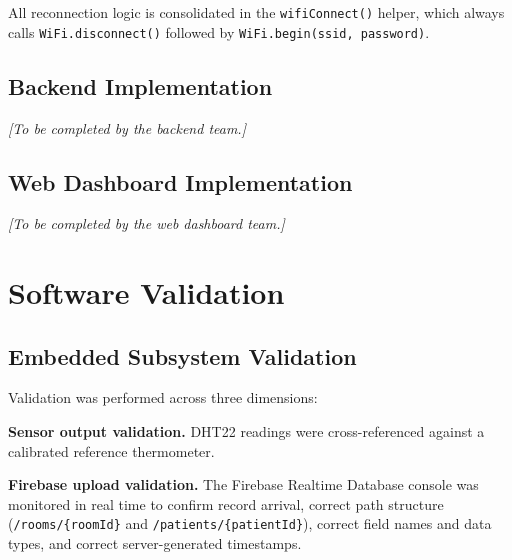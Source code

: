 All reconnection logic is consolidated in the \texttt{wifiConnect()} helper, which
always calls \texttt{WiFi.disconnect()} followed by
\texttt{WiFi.begin(ssid, password)}.

\subsection{Backend Implementation}
\begin{center}
	\textit{[To be completed by the backend team.]}
\end{center}

\subsection{Web Dashboard Implementation}
\begin{center}
	\textit{[To be completed by the web dashboard team.]}
\end{center}

\section{Software Validation}

\subsection{Embedded Subsystem Validation}

Validation was performed across three dimensions:

\textbf{Sensor output validation.}
DHT22 readings were cross-referenced against a calibrated reference thermometer.

\textbf{Firebase upload validation.}
The Firebase Realtime Database console was monitored in real time to confirm record
arrival, correct path structure (\texttt{/rooms/\{roomId\}} and
\texttt{/patients/\{patientId\}}), correct field names and data types, and
correct server-generated timestamps.

